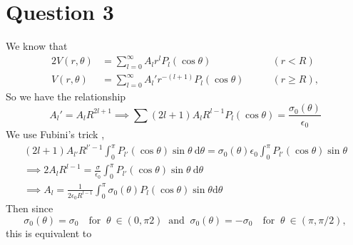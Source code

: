 \documentclass[12pt]{article}
\newcommand{\ep}{\epsilon}
\theoremstyle{definition}
\theoremstyle{definition}
\theoremstyle{definition}
\theoremstyle{definition}
\theoremstyle{definition}
\theoremstyle{example}
\theoremstyle{note}
\theoremstyle{remark}
\theoremstyle{example}
\begin{document}
		\section*{Question 3}
			We know that 
			\begin{alignat*}{2}
			V(r,\theta) &= \sum_{l=0}^{\infty} A_{l} r^{l} P_{l} (\cos \theta) &\qquad (r < R)\\
			V(r,\theta) &= \sum_{l=0}^{\infty} A_{l}' r^{-(l+1)} P_{l} (\cos \theta) &\qquad (r \ge R),
			\end{alignat*}
			So we have the relationship 
			\begin{equation} 
			A_{l} ' = A_{l} R^{2l +1} \implies \sum (2l +1)A_{l} R^{l-1} P_{l}(\cos \theta) = \frac{\sigma_{0} (\theta)}{\ep_{0}} 
			\end{equation}
			We use Fubini's trick ,
			\begin{gather*}
				 (2l+1) A_{l'}R^{l'-1} \int_{0}^{\pi }P_{l'} (\cos \theta) \sin \theta \ \mathrm{d}\theta = \sigma_{0} (\theta)\ep_{0} \int_{0}^{\pi} P_{l'} (\cos \theta) \sin \theta \\
				 \implies 2 A_{l} R^{l-1} = \frac{\sigma}{\ep_{0}}\int_{0}^{\pi} P_{l'} (\cos \theta) \sin \theta \ \mathrm{d} \theta\\
				 \implies A_{l} =\frac{1}{2 \ep_{0} R^{l-1}} \int_{0}^{\pi } \sigma_{0}(\theta) P_{l} (\cos \theta) \sin \theta  \mathrm{d} \theta
			\end{gather*}
			Then since 
			$$ \sigma_{0}(\theta) = \sigma_{0} \quad \text{for } \ \theta \ \in (0 , \pi 2) \ \text{ and } \ \sigma_{0}(\theta) = -\sigma_{0} \quad \text{for } \ \theta \ \in (\pi , \pi/2),$$
			this is equivalent to 
\end{document}
